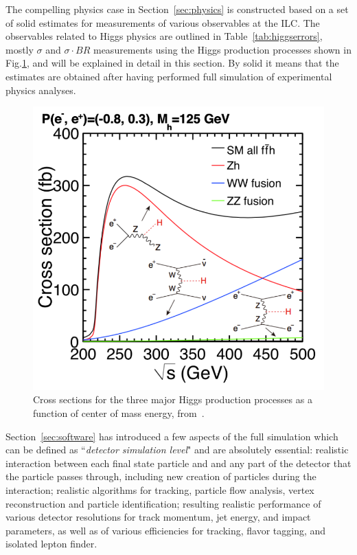 The compelling physics case in Section~\ref{sec:physics} is constructed 
based on a set of solid estimates for measurements of various observables at the ILC. 
The observables related to Higgs physics are outlined in Table~\ref{tab:higgserrors}, 
mostly $\sigma$ and $\sigma\cdot BR$ measurements
using the Higgs production processes shown in Fig.\ref{fig:HiggsProdILC},
 and will be explained in detail in this section. 
By solid it means that the estimates are obtained after having performed
full simulation of experimental physics analyses. 

\begin{figure}
\begin{center}
\includegraphics[width=0.85\hsize]{chapters/figures/xsec_h_ILC_left.pdf}
\end{center}
\caption{Cross sections for the three major Higgs production processes
  as a function of 
center of mass energy, 
from~\cite{Baer:2013cma}.}
\label{fig:HiggsProdILC}
\end{figure}

Section~\ref{sec:software} has introduced a few aspects of the full simulation
which can be defined as ``{\it detector simulation level}" and are absolutely essential: 
realistic interaction between each final state particle and 
and any part of the detector that the particle passes through, including new creation of
particles during the interaction; realistic algorithms for tracking,
particle flow analysis, vertex reconstruction and particle identification; 
resulting realistic performance of various detector resolutions for track momentum, jet energy,
and impact parameters, as well as of various efficiencies for tracking, flavor tagging, 
and isolated lepton finder. 

